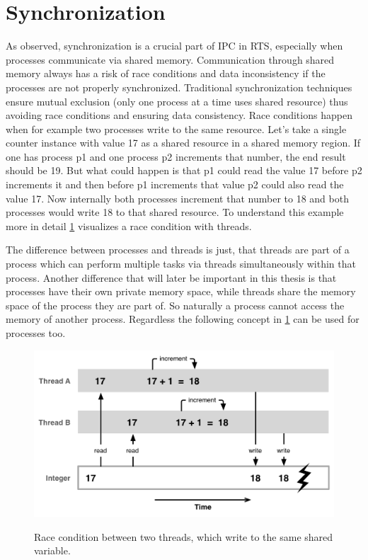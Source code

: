 \section{Synchronization}\label{sec:synchronization}

As observed, synchronization is a crucial part of \ac{IPC} in \ac{RTS}, especially when processes communicate via shared memory. Communication through shared memory always has a risk of race conditions and data inconsistency if the processes are not properly synchronized. Traditional synchronization techniques ensure mutual exclusion (only one process at a time uses shared resource) thus avoiding race conditions and ensuring data consistency. Race conditions happen when for example two processes write to the same resource. Let's take a single counter instance with value 17 as a shared resource in a shared memory region. If one has process p1 and one process p2 increments that number, the end result should be 19. But what could happen is that p1 could read the value 17 before p2 increments it and then before p1 increments that value p2 could also read the value 17. Now internally both processes increment that number to 18 and both processes would write 18 to that shared resource. To understand this example more in detail \cref{fig:race-condition} visualizes a race condition with threads. 

The difference between processes and threads is just, that threads are part of a process which can perform multiple tasks via threads simultaneously within that process. Another difference that will later be important in this thesis is that processes have their own private memory space, while threads share the memory space of the process they are part of. So naturally a process cannot access the memory of another process. Regardless the following concept in \cref{fig:race-condition} can be used for processes too. \cite{processesVSthreads}

\begin{figure}[!ht]
    \centering
    \captionsetup{justification=centering}
    \caption{Race condition between two threads, which write to the same shared variable.}
    \includegraphics[width=115mm]{images/race-condition.png}
    \cite{Race-Condition}
    \label{fig:race-condition}
\end{figure}


